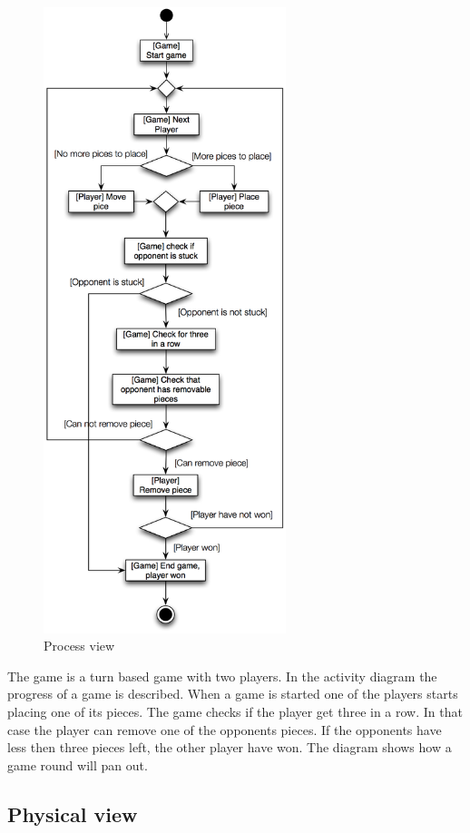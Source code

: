 \begin{figure}[H]
\begin{center}
\includegraphics[width=200pt]{./Images/ProcessView}
\end{center}
\caption{Process view}
\end{figure}

The game is a turn based game with two players. In the activity diagram the progress of a game is described. When a game is started one of the players starts placing one of its pieces. The game checks if the player get three in a row. In that case the player can remove one of the opponents pieces. If the opponents have less then three pieces left, the other player have won. The diagram shows how a game round will pan out. 

\subsection{Physical view}

